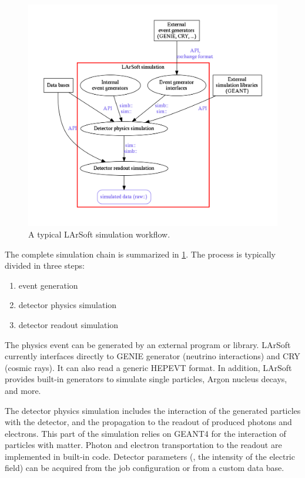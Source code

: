 \begin{figure}[htbp]
  \centering
  \includegraphics[width=\textwidth]{figures/LArSoftSimulationGraph.pdf}
  \caption{\label{fig:LArSoftSimulation}A typical LArSoft simulation workflow.}
\end{figure}
The complete simulation chain is summarized in \cref{fig:LArSoftSimulation}.
The process is typically divided in three steps:
\begin{enumerate}
  \item event generation
  \item detector physics simulation
  \item detector readout simulation
\end{enumerate}

The physics event can be generated by an external program or library.
LArSoft currently interfaces directly to GENIE generator (neutrino interactions)
and CRY (cosmic rays). It can also read a generic HEPEVT\cite{HEPEVT} format.
In addition, LArSoft provides built-in generators to simulate single particles,
Argon nucleus decays, and more.

The detector physics simulation includes the interaction of the
generated particles with the detector, and the propagation to the
readout of produced photons and electrons. This part of the simulation
relies on GEANT4 for the interaction of particles with matter. Photon
and electron transportation to the readout are implemented in built-in
code. Detector parameters (\eg, the intensity of the electric field)
can be acquired from the job configuration or from a custom data base.

